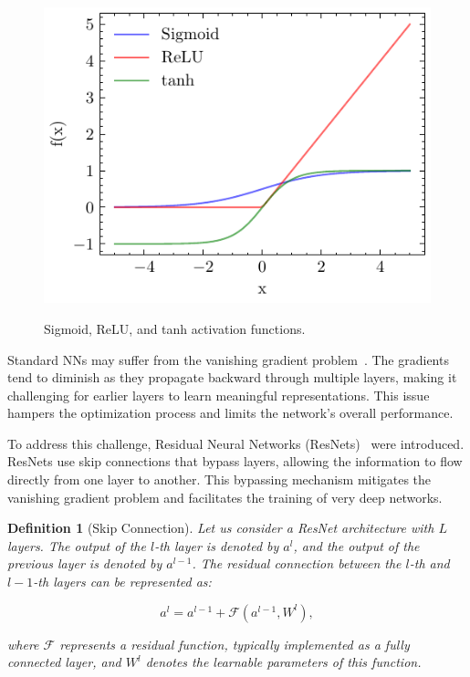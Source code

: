\documentclass[ppgc,diss,english]{iiufrgs}
\newtheorem{definition}{Definition}
\begin{document}
\begin{figure}[ht]
\caption[Common activation functions]{Sigmoid, ReLU, and tanh activation functions.}
\vspace{\baselineskip}
\centering
\includegraphics[]{img/sigmoid-relu-tanh}
\label{fig:activation-functions}
\end{figure}

Standard NNs may suffer from the vanishing gradient problem~\cite{Bengio.etal/1994}. The gradients tend to diminish as they propagate backward through multiple layers, making it challenging for earlier layers to learn meaningful representations. This issue hampers the optimization process and limits the network's overall performance.

To address this challenge, Residual Neural Networks (ResNets)~\cite{He.etal/2016} were introduced. ResNets use skip connections that bypass layers, allowing the information to flow directly from one layer to another. This bypassing mechanism mitigates the vanishing gradient problem and facilitates the training of very deep networks.

\begin{definition}[Skip Connection]
Let us consider a ResNet architecture with $L$ layers. The output of the $l$-th layer is denoted by $a^{l}$, and the output of the previous layer is denoted by $a^{l-1}$. The residual connection between the $l$-th and $l-1$-th layers can be represented as:

$$a^{l} = a^{l-1} + \mathcal{F}(a^{l-1}, W^{l}),$$

where $\mathcal{F}$ represents a residual function, typically implemented as a fully connected layer, and $W^{l}$ denotes the learnable parameters of this function.
\end{definition}
\end{document}
